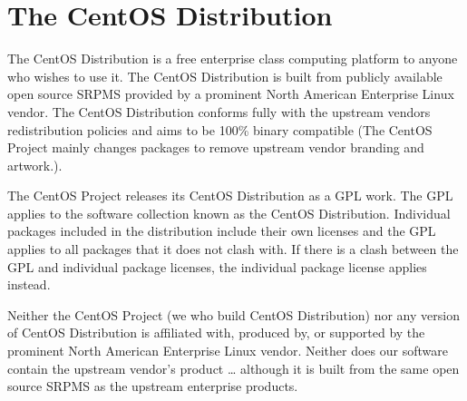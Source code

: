     \section{The CentOS Distribution}
\hypertarget{sec:Concepts:CentOS:Distribution}{}
      \label{sec:Concepts:CentOS:Distribution}

The CentOS Distribution is a free enterprise class computing platform
to anyone who wishes to use it.  The CentOS Distribution is built from
publicly available open source SRPMS provided by a prominent North
American Enterprise Linux vendor.  The CentOS Distribution conforms
fully with the upstream vendors redistribution policies and aims to be
100\% binary compatible (The CentOS Project mainly changes packages to
remove upstream vendor branding and artwork.).

The CentOS Project releases its CentOS Distribution as a GPL work. The
GPL applies to the software collection known as the CentOS
Distribution.  Individual packages included in the distribution
include their own licenses and the GPL applies to all packages that it
does not clash with. If there is a clash between the GPL and
individual package licenses, the individual package license applies
instead.

Neither the CentOS Project (we who build CentOS Distribution) nor any
version of CentOS Distribution is affiliated with, produced by, or
supported by the prominent North American Enterprise Linux vendor.
Neither does our software contain the upstream vendor's product \dots
although it is built from the same open source SRPMS as the upstream
enterprise products.

